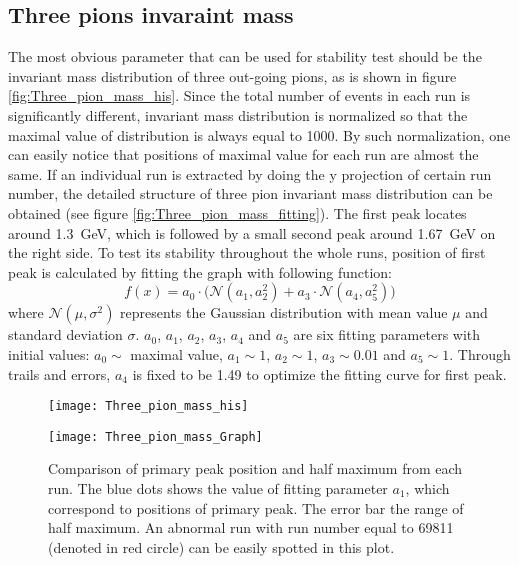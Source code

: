 \subsection{Three pions invaraint mass}
The most obvious parameter that can be used for stability test should be the invariant mass distribution of three out-going pions, as is shown in figure \ref{fig:Three_pion_mass_his}. Since the total number of events in each run is significantly different, invariant mass distribution is normalized so that the maximal value of distribution is always equal to 1000. By such normalization, one can easily notice that positions of maximal value for each run are almost the same. If an individual run is extracted by doing the y projection of certain run number, the detailed structure of three pion invariant mass distribution can be obtained (see figure \ref{fig:Three_pion_mass_fitting}). The first peak locates around \SI{1.3}{\giga\electronvolt}, which is followed by a small second peak around \SI{1.67}{\giga\electronvolt} on the right side. To test its stability throughout the whole runs, position of first peak is calculated by fitting the graph with following function:
\begin{equation}
f(x) = a_0 \cdot \Big(\mathcal{N}(a_1, a_2^2)+a_3 \cdot \mathcal{N}(a_4, a_5^2)\Big)
\end{equation}
where $\mathcal{N}(\mu,\sigma^2)$ represents the Gaussian distribution with mean value $\mu$ and standard deviation $\sigma$. $a_0$, $a_1$, $a_2$, $a_3$, $a_4$ and $a_5$ are six fitting parameters with initial values: $a_0 \sim$ maximal value, $a_1 \sim 1$, $a_2 \sim 1$, $a_3 \sim 0.01$ and $a_5 \sim 1$. Through trails and errors, $a_4$ is fixed to be 1.49 to optimize the fitting curve for first peak.

\begin{figure*}[!ht]
	\centering
	\vspace{2cm}
	\texttt{[image: Three\_pion\_mass\_his]}
	\caption{Histogram of invariant mass distribution of three pions for each run. The colors inside the histogram represent number of events corresponding to run number and invariant mass. To better compare and conceive the structure of distribution between runs visually, the maximal value of each distribution is normalized to 1000. As one can easily notice that maximal value or peak of distribution locates around \SI{1.3}{\giga\electronvolt} for almost every run.}
	\label{fig:Three_pion_mass_his}
	\vspace{2 cm}
	
	\texttt{[image: Three\_pion\_mass\_Graph]}
	\caption{Comparison of primary peak position and half maximum from each run. The blue dots shows the value of fitting parameter $a_1$, which correspond to positions of primary peak. The error bar the range of half maximum. An abnormal run with run number equal to 69811 (denoted in red circle) can be easily spotted in this plot.}
	\label{fig:Three_pion_mass_Graph}
	\vspace{2cm}
\end{figure*}


